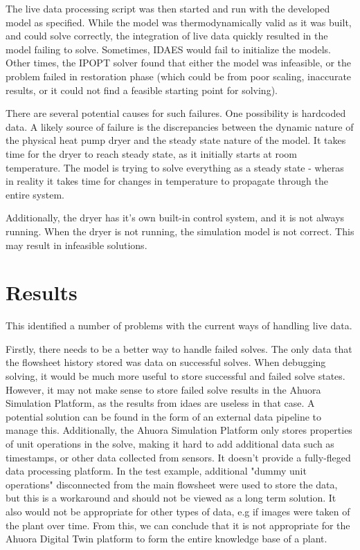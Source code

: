 The live data processing script was then started and run with the developed model as specified.
While the model was thermodynamically valid as it was built, and could solve correctly, the integration of live data quickly resulted in the model failing to solve.
Sometimes, IDAES would fail to initialize the models. Other times, the IPOPT solver found that either the model was infeasible, or the problem failed in restoration phase (which could be from poor scaling, inaccurate results, or it could not find a feasible starting point for solving).


There are several potential causes for such failures. One possibility is hardcoded data. A likely source of failure is the discrepancies between the dynamic nature of the physical heat pump dryer and the steady state nature of the model. It takes time for the dryer to reach steady state, as it initially starts at room temperature. The model is trying to solve everything as a steady state - wheras in reality it takes time for changes in temperature to propagate through the entire system. 

Additionally, the dryer has it's own built-in control system, and it is not always running. When the dryer is not running, the simulation model is not correct. This may result in infeasible solutions. 



\section{Results}

This identified a number of problems with the current ways of handling live data.

Firstly, there needs to be a better way to handle failed solves. The only data that the flowsheet history stored was data on successful solves. When debugging solving, it would be much more useful to store successful and failed solve states. However, it may not make sense to store failed solve results in the Ahuora Simulation Platform, as the results from idaes are useless in that case. 
A potential solution can be found in the form of an external data pipeline to manage this.
Additionally, the Ahuora Simulation Platform only stores properties of unit operations in the solve, making it hard to add additional data such as timestamps, or other data collected from sensors. It doesn't provide a fully-fleged data processing platform. 
In the test example, additional "dummy unit operations" disconnected from the main flowsheet were used to store the data, but this is a workaround and should not be viewed as a long term solution.
It also would not be appropriate for other types of data, e.g if images were taken of the plant over time. From this, we can conclude that it is not appropriate for the Ahuora Digital Twin platform to form the entire knowledge base of a plant.

